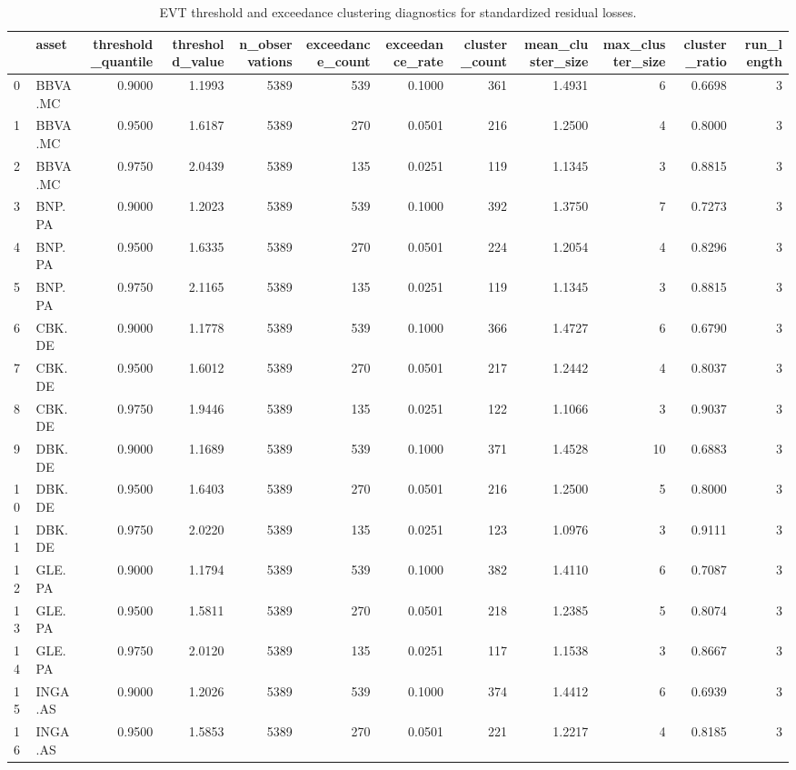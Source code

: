 \begin{table}
\caption{EVT threshold and exceedance clustering diagnostics for standardized residual losses.}
\label{tab:evt_threshold_diagnostics}
\begin{tabular}{llrrrrrrrrrr}
\toprule
 & asset & threshold_quantile & threshold_value & n_observations & exceedance_count & exceedance_rate & cluster_count & mean_cluster_size & max_cluster_size & cluster_ratio & run_length \\
\midrule
0 & BBVA.MC & 0.9000 & 1.1993 & 5389 & 539 & 0.1000 & 361 & 1.4931 & 6 & 0.6698 & 3 \\
1 & BBVA.MC & 0.9500 & 1.6187 & 5389 & 270 & 0.0501 & 216 & 1.2500 & 4 & 0.8000 & 3 \\
2 & BBVA.MC & 0.9750 & 2.0439 & 5389 & 135 & 0.0251 & 119 & 1.1345 & 3 & 0.8815 & 3 \\
3 & BNP.PA & 0.9000 & 1.2023 & 5389 & 539 & 0.1000 & 392 & 1.3750 & 7 & 0.7273 & 3 \\
4 & BNP.PA & 0.9500 & 1.6335 & 5389 & 270 & 0.0501 & 224 & 1.2054 & 4 & 0.8296 & 3 \\
5 & BNP.PA & 0.9750 & 2.1165 & 5389 & 135 & 0.0251 & 119 & 1.1345 & 3 & 0.8815 & 3 \\
6 & CBK.DE & 0.9000 & 1.1778 & 5389 & 539 & 0.1000 & 366 & 1.4727 & 6 & 0.6790 & 3 \\
7 & CBK.DE & 0.9500 & 1.6012 & 5389 & 270 & 0.0501 & 217 & 1.2442 & 4 & 0.8037 & 3 \\
8 & CBK.DE & 0.9750 & 1.9446 & 5389 & 135 & 0.0251 & 122 & 1.1066 & 3 & 0.9037 & 3 \\
9 & DBK.DE & 0.9000 & 1.1689 & 5389 & 539 & 0.1000 & 371 & 1.4528 & 10 & 0.6883 & 3 \\
10 & DBK.DE & 0.9500 & 1.6403 & 5389 & 270 & 0.0501 & 216 & 1.2500 & 5 & 0.8000 & 3 \\
11 & DBK.DE & 0.9750 & 2.0220 & 5389 & 135 & 0.0251 & 123 & 1.0976 & 3 & 0.9111 & 3 \\
12 & GLE.PA & 0.9000 & 1.1794 & 5389 & 539 & 0.1000 & 382 & 1.4110 & 6 & 0.7087 & 3 \\
13 & GLE.PA & 0.9500 & 1.5811 & 5389 & 270 & 0.0501 & 218 & 1.2385 & 5 & 0.8074 & 3 \\
14 & GLE.PA & 0.9750 & 2.0120 & 5389 & 135 & 0.0251 & 117 & 1.1538 & 3 & 0.8667 & 3 \\
15 & INGA.AS & 0.9000 & 1.2026 & 5389 & 539 & 0.1000 & 374 & 1.4412 & 6 & 0.6939 & 3 \\
16 & INGA.AS & 0.9500 & 1.5853 & 5389 & 270 & 0.0501 & 221 & 1.2217 & 4 & 0.8185 & 3 \\

\end{tabular}
\end{table}

